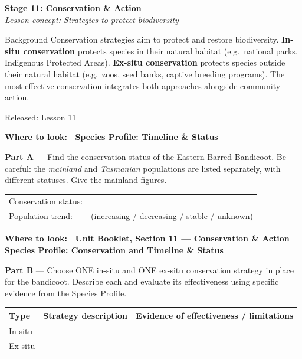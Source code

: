 \documentclass[11pt,a4paper]{article}
\newcommand{\wheretolook}[1]{%
  \par\vspace{2pt}\noindent
  \colorbox{GoldLight}{\parbox{\dimexpr\linewidth-2\fboxsep\relax}{%
    \small\color{GoldDark}\headingfont\bfseries Where to look:\ %
    \normalfont\color{DarkGrey}#1}}\par\vspace{4pt}}
\newcommand{\stagediv}[3]{%
  \needspace{6\baselineskip}
  \begin{tcolorbox}[
    enhanced, breakable=false, arc=3.5mm,
    colback=ForestDark, colframe=ForestDark, boxrule=0pt,
    sidebyside, sidebyside align=center,
    lefthand width=2.2cm,
    left=2mm, right=4mm, top=4mm, bottom=4mm
  ]
    \begin{center}
      {\headingfont\bfseries\color{Forest!35!ForestDark}\fontsize{42}{42}\selectfont #1}
    \end{center}
    \tcblower
    {\headingfont\bfseries\color{white}\large Stage #1: #2}\\[3pt]
    {\itshape\color{white!75!ForestDark}\small Lesson concept: #3}
  \end{tcolorbox}%
  \vspace{6pt}%
}
\newcommand{\yr}[2]{\noindent{\headingfont\bfseries\small\color{Forest}%
  \rule[0.2ex]{1.2em}{2pt}\hspace{4pt}#1}\hfill{\small\color{DarkGrey}#2}\\[2pt]}
\begin{document}
\newpage

\stagediv{11}{Conservation \& Action}{Strategies to protect biodiversity}

\begin{contextbox}{Background}
Conservation strategies aim to protect and restore biodiversity. \textbf{In-situ conservation} protects species in their natural habitat (e.g.\ national parks, Indigenous Protected Areas). \textbf{Ex-situ conservation} protects species outside their natural habitat (e.g.\ zoos, seed banks, captive breeding programs). The most effective conservation integrates both approaches alongside community action.
\end{contextbox}

\bigskip

\begin{yr7box}
\yr{At The Level}{Released: Lesson 11}

\wheretolook{\textbf{Species Profile: Timeline \& Status}}
\textbf{Part A} --- Find the conservation status of the Eastern Barred Bandicoot. Be careful: the \emph{mainland} and \emph{Tasmanian} populations are listed separately, with different statuses. Give the mainland figures.

\medskip
\noindent\begin{tabular}{@{}ll@{}}
  Conservation status: & \underline{\hspace{5cm}} \\[8pt]
  Population trend: & \underline{\hspace{4cm}} {\small(increasing / decreasing / stable / unknown)}
\end{tabular}

\bigskip
\wheretolook{Unit Booklet, Section 11 --- Conservation \& Action \textbullet{} \textbf{Species Profile: Conservation} and \textbf{Timeline \& Status}}
\textbf{Part B} --- Choose ONE in-situ and ONE ex-situ conservation strategy in place for the bandicoot. Describe each and evaluate its effectiveness using specific evidence from the Species Profile.

\medskip
\noindent\begin{tabularx}{\linewidth}{|p{2.5cm}|p{4.5cm}|X|}
  \hline
  \rowcolor{TableHead}
  \headingfont\bfseries\color{white} Type &
  \headingfont\bfseries\color{white} Strategy description &
  \headingfont\bfseries\color{white} Evidence of effectiveness / limitations \\
  \hline
  In-situ & & \\[112pt]
  \hline
  \rowcolor{RowAlt}
  Ex-situ & & \\[112pt]
  \hline
\end{tabularx}
\end{yr7box}
\end{document}
